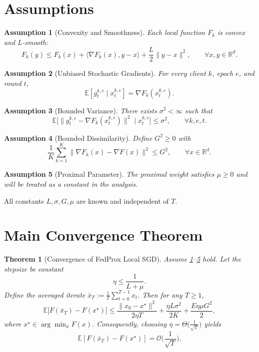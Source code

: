 \documentclass{article}
\newtheorem{theorem}{Theorem}
\newtheorem{assumption}{Assumption}
\begin{document}
\newpage
\section*{Assumptions}
\begin{assumption}[Convexity and Smoothness]\label{ass:convex}
Each local function $F_k$ is convex and $L$‑smooth:
\[
F_k(y)\le F_k(x)+\langle\nabla F_k(x),y-x\rangle+\frac{L}{2}\|y-x\|^2,
\qquad\forall x,y\in\mathbb{R}^d.
\]
\end{assumption}
\begin{assumption}[Unbiased Stochastic Gradients]\label{ass:unbias}
For every client $k$, epoch $e$, and round $t$,
\[
\mathbb{E}[g_{t}^{k,e}\mid x_{t}^{k,e}]=\nabla F_k(x_{t}^{k,e}).
\]
\end{assumption}
\begin{assumption}[Bounded Variance]\label{ass:variance}
There exists $\sigma^2<\infty$ such that
\[
\mathbb{E}\big[\|g_{t}^{k,e}-\nabla F_k(x_{t}^{k,e})\|^2\mid x_{t}^{k,e}\big]
\le\sigma^2,\qquad\forall k,e,t.
\]
\end{assumption}
\begin{assumption}[Bounded Dissimilarity]\label{ass:dissim}
Define $G^2\ge0$ with
\[
\frac1K\sum_{k=1}^K\|\nabla F_k(x)-\nabla F(x)\|^2\le G^2,
\qquad\forall x\in\mathbb{R}^d.
\]
\end{assumption}
\begin{assumption}[Proximal Parameter]\label{ass:mu}
The proximal weight satisfies $\mu\ge 0$ and will be treated as a
constant in the analysis.
\end{assumption}
All constants $L,\sigma,G,\mu$ are known and independent of $T$.

\section*{Main Convergence Theorem}
\begin{theorem}[Convergence of FedProx Local SGD]\label{thm:main}
Assume \ref{ass:convex}–\ref{ass:mu} hold.
Let the stepsize be constant
\[
\eta\le\frac{1}{L+ \mu}.
\]
Define the averaged iterate $\displaystyle\bar x_T:=\frac1T\sum_{t=0}^{T-1}x_t$.
Then for any $T\ge1$,
\[
\mathbb{E}\big[F(\bar x_T)-F(x^\star)\big]
\le
\frac{\|x_0-x^\star\|^2}{2\eta T}
+\frac{\eta L\sigma^2}{2K}
+\frac{E\eta\mu G^2}{2},
\tag{Bound}
\]
where $x^\star\in\arg\min_x F(x)$.
Consequently, choosing $\eta=\Theta\!\big(\frac{1}{\sqrt{T}}\big)$ yields
\[
\mathbb{E}[F(\bar x_T)-F(x^\star)]=\mathcal{O}\!\Big(\frac{1}{\sqrt{T}}\Big).
\]
\end{theorem}
\end{document}
